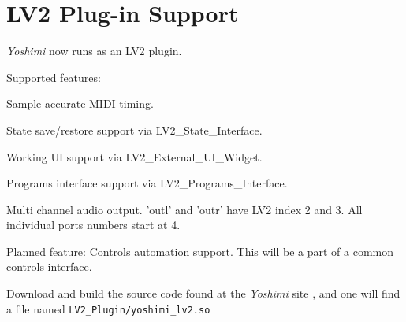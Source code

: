 %
%
%

\section{LV2 Plug-in Support}
\label{sec:lv2_plugin}

   \textsl{Yoshimi} now runs as an LV2 plugin.

Supported features:

   \begin{enumber}
      \item Sample-accurate MIDI timing.
      \item State save/restore support via LV2\_State\_Interface.
      \item Working UI support via LV2\_External\_UI\_Widget.
      \item Programs interface support via LV2\_Programs\_Interface.
      \item Multi channel audio output. 'outl' and 'outr' have LV2 index 2
         and 3. All individual ports numbers start at 4.
   \end{enumber}

   Planned feature: Controls automation support. This will be a part of a
   common controls interface.

   Download and build the source code found at the
   \textsl{Yoshimi} site \cite{yoshimi},
   and one will find a file named
   \texttt{LV2\_Plugin/yoshimi\_lv2.so}

%

